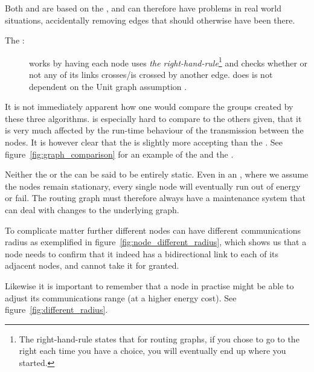 Both \gabe and \rng are based on the \uga, and can therefore have problems in real world situations, accidentally removing edges that should otherwise have been there\cite{practical}.
\label{right-hand rule}
\begin{description}
\item[The \cldp:] \cldp works by having each node uses \emph{the right-hand-rule}\footnote{The right-hand-rule states that for routing graphs, if you chose to go to the right each time you have a choice, you will eventually end up where you started.} and checks whether or not any of its links crosses/is crossed by another edge. \cldp does is not dependent on the Unit graph assumption \cite{practical}. 
\end{description}


It is not immediately apparent how one would compare the groups created by these three algorithms. \cldp is especially hard to compare to the others given, that it is very much affected by the run-time behaviour of the transmission between the nodes. It is however clear that the \gabe is slightly more accepting than the \rng. See figure~\ref{fig:graph_comparison} for an example of the \rng and the \gabe.

Neither the \manet or the \anet can be said to be entirely static. Even in an \anet, where we assume the nodes remain stationary, every single node will eventually run out of energy or fail. The routing graph must therefore always have a maintenance system that can deal with changes to the underlying graph. 

To complicate matter further different nodes can have different communications radius as exemplified in figure~\ref{fig:node_different_radius}, which shows us that a node needs to confirm that it indeed has a bidirectional link to each of its adjacent nodes, and cannot take it for granted.


Likewise it is important to remember that a node in practise might be able to adjust its communications range (at a higher energy cost). See figure~\ref{fig:different_radius}.

